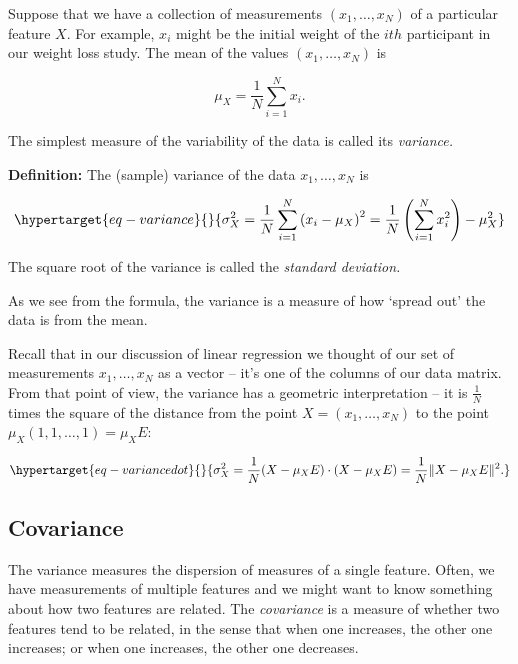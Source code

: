 \documentclass[
  11pt,
  letterpaper,
]{scrbook}
\theoremstyle{plain}
\theoremstyle{plain}
\theoremstyle{remark}
\begin{document}
Suppose that we have a collection of measurements \((x_1,\ldots, x_N)\)
of a particular feature \(X\). For example, \(x_i\) might be the initial
weight of the \(ith\) participant in our weight loss study. The mean of
the values \((x_1,\ldots, x_N)\) is

\[
\mu_{X} = \frac{1}{N}\sum_{i=1}^{N} x_{i}.
\]

The simplest measure of the variability of the data is called its
\emph{variance.}

\textbf{Definition:} The (sample) variance of the data
\(x_1,\ldots, x_N\) is

\begin{equation}\protect\hypertarget{eq-variance}{}{
\sigma_{X}^2 = \frac{1}{N}\sum_{i=1}^{N} \left(x_{i}-\mu_{X}\right)^2 = \frac{1}{N}\left(\sum_{i=1}^{N} x_{i}^2\right)- \mu_{X}^2
}\label{eq-variance}\end{equation}

The square root of the variance is called the \emph{standard deviation.}

As we see from the formula, the variance is a measure of how `spread
out' the data is from the mean.

Recall that in our discussion of linear regression we thought of our set
of measurements \(x_1,\ldots, x_N\) as a vector -- it's one of the
columns of our data matrix. From that point of view, the variance has a
geometric interpretation -- it is \(\frac{1}{N}\) times the square of
the distance from the point \(X=(x_1,\ldots, x_N)\) to the point
\(\mu_{X}(1,1,\ldots,1)=\mu_{X}E\):

\begin{equation}\protect\hypertarget{eq-variancedot}{}{
\sigma_{X}^2 = \frac{1}{N}(X-\mu_{X}E)\cdot(X-\mu_{X}E)  = \frac{1}{N}\|X-\mu_{X}E\|^2.
}\label{eq-variancedot}\end{equation}

\hypertarget{covariance}{%
\subsection{Covariance}\label{covariance}}

The variance measures the dispersion of measures of a single feature.
Often, we have measurements of multiple features and we might want to
know something about how two features are related. The \emph{covariance}
is a measure of whether two features tend to be related, in the sense
that when one increases, the other one increases; or when one increases,
the other one decreases.
\end{document}
